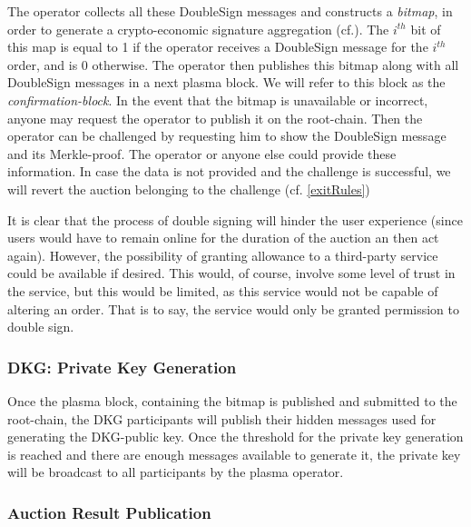 \documentclass[11pt,parskip=full]{scrartcl}%
\begin{document}
The operator collects all these DoubleSign messages and constructs a \emph{bitmap}, in order to generate a crypto-economic signature aggregation (cf.\cite{sig}). 
The $i^{th}$ bit of this map is equal to 1 if the operator receives a DoubleSign message for the $i^{th}$ order, and is 0 otherwise.
The operator then publishes this bitmap along with all DoubleSign messages in a next plasma block. We will refer to this block as the \emph{confirmation-block}.\newline
In the event that the bitmap is unavailable or incorrect, anyone may request the operator to publish it on the root-chain.
Then the operator can be challenged by requesting him to show the DoubleSign message and its Merkle-proof.
The operator or anyone else could provide these information. 
In case the data is not provided and the challenge is successful, we will revert the auction belonging to the challenge (cf. \ref{exitRules})


It is clear that the process of double signing will hinder the user experience (since users would have to remain online for the duration of the auction an then act again). 
However, the possibility of granting allowance to a third-party service could be available if desired.
This would, of course, involve some level of trust in the service, but this would be limited, as this service would not be capable of altering an order. That is to say, the service would only be granted permission to double sign.

\subsubsection{DKG: Private Key Generation}
Once the plasma block, containing the bitmap is published and submitted to the root-chain, the DKG participants will publish their hidden messages used for generating the DKG-public key. 
Once the threshold for the private key generation is reached and there are enough messages available to generate it, the private key will be broadcast to all participants by the plasma operator.

\subsubsection{Auction Result Publication}
\end{document}
